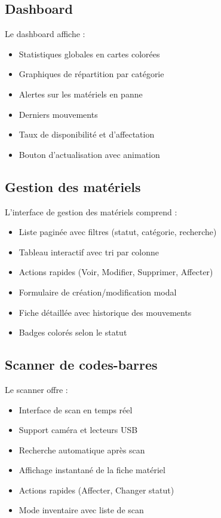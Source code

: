 \subsection{Dashboard}

Le dashboard affiche :
\begin{itemize}
    \item Statistiques globales en cartes colorées
    \item Graphiques de répartition par catégorie
    \item Alertes sur les matériels en panne
    \item Derniers mouvements
    \item Taux de disponibilité et d'affectation
    \item Bouton d'actualisation avec animation
\end{itemize}

\subsection{Gestion des matériels}

L'interface de gestion des matériels comprend :
\begin{itemize}
    \item Liste paginée avec filtres (statut, catégorie, recherche)
    \item Tableau interactif avec tri par colonne
    \item Actions rapides (Voir, Modifier, Supprimer, Affecter)
    \item Formulaire de création/modification modal
    \item Fiche détaillée avec historique des mouvements
    \item Badges colorés selon le statut
\end{itemize}

\subsection{Scanner de codes-barres}

Le scanner offre :
\begin{itemize}
    \item Interface de scan en temps réel
    \item Support caméra et lecteurs USB
    \item Recherche automatique après scan
    \item Affichage instantané de la fiche matériel
    \item Actions rapides (Affecter, Changer statut)
    \item Mode inventaire avec liste de scan
\end{itemize}

